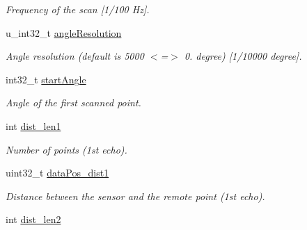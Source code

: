 \begin{DoxyCompactItemize}
\begin{DoxyCompactList}\small\item\em Frequency of the scan \mbox{[}1/100 Hz\mbox{]}. \end{DoxyCompactList}\item 
\hypertarget{structpacpus_1_1SickLMS__dbt_acbc0527837e1a0442420c0d79aa4f72f}{u\-\_\-int32\-\_\-t \hyperlink{structpacpus_1_1SickLMS__dbt_acbc0527837e1a0442420c0d79aa4f72f}{angle\-Resolution}}\label{structpacpus_1_1SickLMS__dbt_acbc0527837e1a0442420c0d79aa4f72f}

\begin{DoxyCompactList}\small\item\em Angle resolution (default is 5000 $<$=$>$ 0. degree) \mbox{[}1/10000 degree\mbox{]}. \end{DoxyCompactList}\item 
\hypertarget{structpacpus_1_1SickLMS__dbt_a11ac14e5c8662c054f750ded3cb6da71}{int32\-\_\-t \hyperlink{structpacpus_1_1SickLMS__dbt_a11ac14e5c8662c054f750ded3cb6da71}{start\-Angle}}\label{structpacpus_1_1SickLMS__dbt_a11ac14e5c8662c054f750ded3cb6da71}

\begin{DoxyCompactList}\small\item\em Angle of the first scanned point. \end{DoxyCompactList}\item 
\hypertarget{structpacpus_1_1SickLMS__dbt_a2b8b48872c09823f22f98f1085a065a3}{int \hyperlink{structpacpus_1_1SickLMS__dbt_a2b8b48872c09823f22f98f1085a065a3}{dist\-\_\-len1}}\label{structpacpus_1_1SickLMS__dbt_a2b8b48872c09823f22f98f1085a065a3}

\begin{DoxyCompactList}\small\item\em Number of points (1st echo). \end{DoxyCompactList}\item 
\hypertarget{structpacpus_1_1SickLMS__dbt_ac963dda9a0489f79288c972419d94541}{uint32\-\_\-t \hyperlink{structpacpus_1_1SickLMS__dbt_ac963dda9a0489f79288c972419d94541}{data\-Pos\-\_\-dist1}}\label{structpacpus_1_1SickLMS__dbt_ac963dda9a0489f79288c972419d94541}

\begin{DoxyCompactList}\small\item\em Distance between the sensor and the remote point (1st echo). \end{DoxyCompactList}\item 
\hypertarget{structpacpus_1_1SickLMS__dbt_afb7fcb7cc7ec15ad7c0ce63978109adb}{int \hyperlink{structpacpus_1_1SickLMS__dbt_afb7fcb7cc7ec15ad7c0ce63978109adb}{dist\-\_\-len2}}\label{structpacpus_1_1SickLMS__dbt_afb7fcb7cc7ec15ad7c0ce63978109adb}


\end{DoxyCompactItemize}
